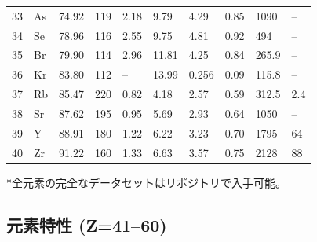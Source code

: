 \documentclass[11pt,a4paper]{article}
\theoremstyle{remark}
\begin{document}
\begin{longtable}{p{0.6cm}p{1.2cm}p{1.2cm}p{1.2cm}p{1.2cm}p{1.2cm}p{1.5cm}p{1.2cm}p{1.2cm}p{1.2cm}}
		33 & As & 74.92 & 119 & 2.18 & 9.79 & 4.29 & 0.85 & 1090 & – \\
		34 & Se & 78.96 & 116 & 2.55 & 9.75 & 4.81 & 0.92 & 494 & – \\
		35 & Br & 79.90 & 114 & 2.96 & 11.81 & 4.25 & 0.84 & 265.9 & – \\
		36 & Kr & 83.80 & 112 & –    & 13.99 & 0.256 & 0.09 & 115.8 & – \\
		37 & Rb & 85.47 & 220 & 0.82 & 4.18 & 2.57 & 0.59 & 312.5 & 2.4 \\
		38 & Sr & 87.62 & 195 & 0.95 & 5.69 & 2.93 & 0.64 & 1050 & – \\
		39 & Y  & 88.91 & 180 & 1.22 & 6.22 & 3.23 & 0.70 & 1795 & 64 \\
		40 & Zr & 91.22 & 160 & 1.33 & 6.63 & 3.57 & 0.75 & 2128 & 88 \\
		\bottomrule
	\end{longtable}
	*全元素の完全なデータセットはリポジトリで入手可能。
	
	\subsection*{元素特性 (Z=41–60)}
	
\end{document}
